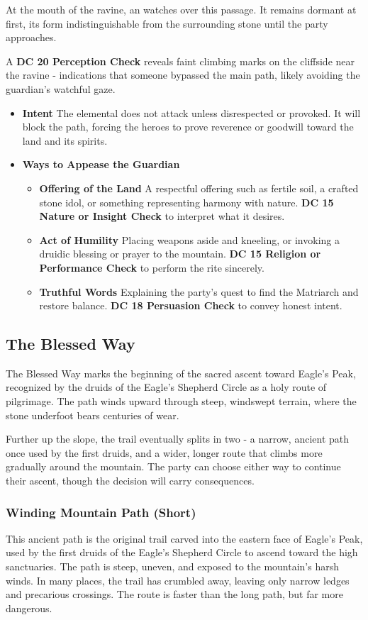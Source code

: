 {{At the mouth of the ravine, an \hyperref[monster:EaglesPeakGuardian]{} watches over this passage. It remains dormant at first, its form indistinguishable from the surrounding stone until the party approaches.

A \textbf{DC 20 Perception Check} reveals faint climbing marks on the cliffside near the ravine - indications that someone bypassed the main path, likely avoiding the guardian's watchful gaze.}
\begin{itemize}
	\item \textbf{Intent} The elemental does not attack unless disrespected or provoked. It will block the path, forcing the heroes to prove reverence or goodwill toward the land and its spirits.
	\item \textbf{Ways to Appease the Guardian}
	\begin{itemize}
		\item \textbf{Offering of the Land} A respectful offering such as fertile soil, a crafted stone idol, or something representing harmony with nature. \textbf{DC 15 Nature or Insight Check} to interpret what it desires.
		\item \textbf{Act of Humility} Placing weapons aside and kneeling, or invoking a druidic blessing or prayer to the mountain. \textbf{DC 15 Religion or Performance Check} to perform the rite sincerely.
		\item \textbf{Truthful Words} Explaining the party's quest to find the Matriarch and restore balance. \textbf{DC 18 Persuasion Check} to convey honest intent.
	\end{itemize}
\end{itemize}}
\vfill\eject
\subsection*{The Blessed Way}
{\entryfont The Blessed Way marks the beginning of the sacred ascent toward Eagle's Peak, recognized by the druids of the Eagle's Shepherd Circle as a holy route of pilgrimage. The path winds upward through steep, windswept terrain, where the stone underfoot bears centuries of wear.

Further up the slope, the trail eventually splits in two - a narrow, ancient path once used by the first druids, and a wider, longer route that climbs more gradually around the mountain. The party can choose either way to continue their ascent, though the decision will carry consequences.}
\subsubsection*{Winding Mountain Path (Short)}
{\entryfont This ancient path is the original trail carved into the eastern face of Eagle's Peak, used by the first druids of the Eagle's Shepherd Circle to ascend toward the high sanctuaries. The path is steep, uneven, and exposed to the mountain's harsh winds. In many places, the trail has crumbled away, leaving only narrow ledges and precarious crossings. The route is faster than the long path, but far more dangerous.}
